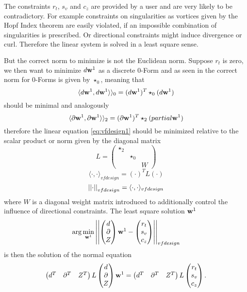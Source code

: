 The constraints $r_t$, $s_v$ and $c_z$ are provided by a user and are very likely to be contradictory. For example constraints on singularities as vortices given by the Hopf Index theorem are easily violated, if an impossible combination of singularities is prescribed. Or directional constraints might induce divergence or curl. Therefore the linear system is solved in a least square sense.

But the correct norm to minimize is not the Euclidean norm. Suppose $r_t$ is zero, we then want to minimize $d\textbf{w}^1$ as a discrete $0$-Form and as seen in  the correct norm for $0$-Forms is given by $\star_0$, meaning that
\[\langle d\textbf{w}^1, d\textbf{w}^1\rangle \rangle_0 = (d\textbf{w}^1)^T \star_0 (d\textbf{w}^1)
\]
should be minimal and analogously
\[\langle \partial \textbf{w}^1, \partial\textbf{w}^1\rangle \rangle_2 = (\partial\textbf{w}^1)^T \star_2 (partial\textbf{w}^1)\]
therefore the linear equation \ref{eq:vfdesign1}
should be minimized relative to the scalar product or norm given by the diagonal matrix
\[L = \begin{pmatrix}
\star_2 & & \\
 & \star_0 & \\
 & & W
\end{pmatrix}\]
\[\langle \cdot , \cdot\rangle_{vfdesign} = (\cdot)^T L (\cdot)\]
\[\left| \left|  \cdot \right| \right|_{vfdesign} = \langle \cdot,\cdot \rangle_{vfdesign}\]
where $W$ is a diagonal weight matrix introduced to additionally control the influence of directional constraints. The least square solution $\textbf{w}^1$ 
\[\arg\min_{\textbf{w}^1}\left| \left| \begin{pmatrix} d \\
\partial \\
Z
\end{pmatrix} 
\textbf{w}^1 - \begin{pmatrix}
r_t \\
s_v \\
c_z
\end{pmatrix} \right| \right|_{vfdesign}\]
is then the solution of the normal equation 
\begin{equation}\begin{pmatrix} d^T & \partial^T & Z^T \end{pmatrix} L \begin{pmatrix} d \\
\partial \\
Z
\end{pmatrix} \textbf{w}^1= \begin{pmatrix} d^T & \partial^T & Z^T \end{pmatrix} L \begin{pmatrix}
r_t \\
s_v \\
c_z
\end{pmatrix}. \label{eq:vfdesignLQ}\end{equation}

